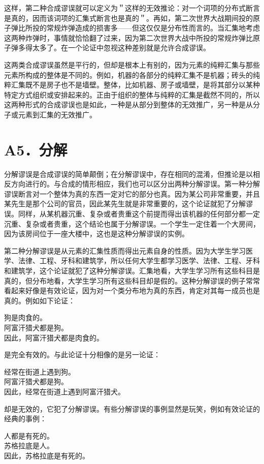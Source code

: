 这样，第二种合成谬误就可以定义为＂这样的无效推论：对一个词项的分布式断言是真的，因而该词项的汇集式断言也是真的＂。再如，第二次世界大战期间投的原子弹比所投的常规炸弹造成的损害多——但这仅仅是分布性而言的。当汇集地考虑这两种炸弹时，事情就恰恰翻了过来，因为第二次世界大战中所投的常规炸弹比原子弹多得太多了。在一个论证中忽视这种差别就是允许合成谬误。

这两类合成谬误虽然是平行的，但却是根本上有别的，因为元素的纯粹汇集与那些元素所构成的整体是不同的。例如，机器的各部分的纯粹汇集不是机器；砖头的纯粹汇集既不是房子也不是墙壁。整体，比如机器、房子或墙壁，是将其部分以某种特定方式组织或安排起来的。正由于组织的整体与纯粹的汇集是截然不同的，所以这两种形式的合成谬误也是如此，一种是从部分到整体的无效推广，另一种是从分子或元素到汇集的无效推广。

\section*{A5．分解}
分解谬误是合成谬误的简单颠倒；在分解谬误中，存在相同的混淆，但推论是以相反方向进行的。与合成的情形相应，我们也可以区分出两种分解谬误。第一种分解谬误断言对一个整体为真的东西一定对它的部分也真。因为某公司非常重要，并且某先生是那个公司的官员，因此某先生就是非常重要的，这个论证就犯了分解谬误。同样，从某机器沉重、复杂或者贵重这个前提而得出该机器的任何部分都一定沉重、复杂或者贵重，这个结论也属于分解谬误。一个学生一定住着一个大房间，因为该房间位于一座大楼中，这也是这种分解谬误的实例。

第二种分解谬误是从元素的汇集性质而得出元素自身的性质。因为大学生学习医学、法律、工程、牙科和建筑学，所以任何大学生都学习医学、法律、工程、牙科和建筑学，这个论证就犯了这种分解谬误。汇集地看，大学生学习所有这些科目是真的，但分布地看，大学生学习所有这些科目却是假的。这种分解谬误的例子常常看起来好像是有效论证，因为对一个类分布地为真的东西，肯定对其每一成员也是真的。例如如下论证：

狗是肉食的。\\
阿富汗猎犬都是狗。\\
因此，阿富汗猎犬都是肉食的。

是完全有效的。与此论证十分相像的是另一论证：

经常在街道上遇到狗。\\
阿富汗猎犬都是狗。\\
因此，经常在街道上遇到阿富汗猎犬。

却是无效的，它犯了分解谬误。有些分解谬误的事例显然是玩笑，例如有效论证的经典的事例：

人都是有死的。\\
苏格拉底是人。\\
因此，苏格拉底是有死的。

